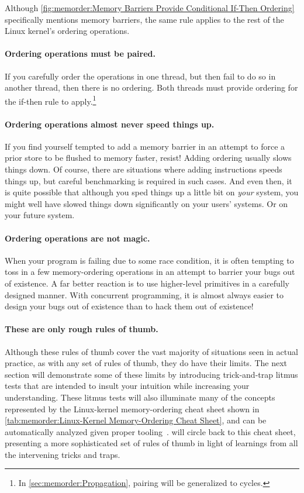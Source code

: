 Although
\cref{fig:memorder:Memory Barriers Provide Conditional If-Then Ordering}
specifically mentions memory barriers, the same rule applies to the
rest of the Linux kernel's ordering operations.

\paragraph{Ordering operations must be paired.}
If you carefully order the operations in one thread, but then fail to do
so in another thread, then there is no ordering.
Both threads must provide ordering for the if-then rule to apply.\footnote{
	In \cref{sec:memorder:Propagation}, pairing will be
	generalized to cycles.}

\paragraph{Ordering operations almost never speed things up.}
If you find yourself tempted to add a memory barrier in an attempt
to force a prior store to be flushed to memory faster, resist!
Adding ordering usually slows things down.
Of course, there are situations where adding instructions speeds things
up, but careful benchmarking is required in such cases.
And even then, it is quite possible that although you sped things up
a little bit on \emph{your} system, you might well have slowed things
down significantly on your users' systems.
Or on your future system.

\paragraph{Ordering operations are not magic.}
When your program is failing due to some race condition, it is often
tempting to toss in a few memory-ordering operations in an attempt
to barrier your bugs out of existence.
A far better reaction is to use higher-level primitives in a carefully
designed manner.
With concurrent programming, it is almost always easier to design
your bugs out of existence than to hack them out of existence!

\paragraph{These are only rough rules of thumb.}
Although these rules of thumb cover the vast majority of situations
seen in actual practice, as with any set of rules of thumb, they
do have their limits.
The next section will demonstrate some of these limits by introducing
trick-and-trap litmus tests that are intended to insult your
intuition while increasing your understanding.
These litmus tests will also illuminate many of the concepts
represented by the Linux-kernel memory-ordering cheat sheet shown in
\cref{tab:memorder:Linux-Kernel Memory-Ordering Cheat Sheet},
and can be automatically analyzed given proper
tooling~\cite{Alglave:2018:FSC:3173162.3177156}.
 will
circle back to this cheat sheet, presenting a more sophisticated set of
rules of thumb in light of learnings from all the intervening tricks
and traps.

